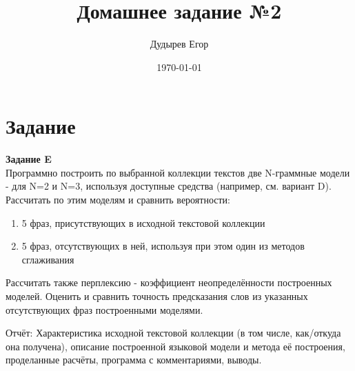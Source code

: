 \documentclass[a4paper,12pt]{article}
\begin{document}
\title{Домашнее задание №2}
\author{Дудырев Егор}
\date{\today}
\maketitle

\section{Задание}
\textbf{Задание E}\\
Программно построить по выбранной коллекции текстов две N-граммные модели - для N=2 и N=3, используя доступные средства (например, см. вариант D). Рассчитать по этим моделям и сравнить вероятности:
\begin{enumerate}
\item 5 фраз, присутствующих в исходной текстовой коллекции
\item 5 фраз, отсутствующих в ней, используя при этом один из методов сглаживания
\end{enumerate}
Рассчитать также перплексию - коэффициент неопределённости построенных моделей. Оценить и сравнить точность предсказания слов из указанных отсутствующих фраз построенными моделями.

Отчёт: Характеристика исходной текстовой коллекции (в том числе, как/откуда она получена), описание построенной языковой модели и метода её построения, проделанные расчёты, программа с комментариями, выводы.
\end{document}
